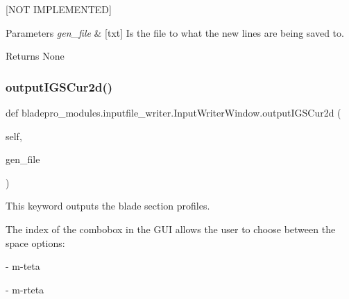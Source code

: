 \mbox{[}N\+OT I\+M\+P\+L\+E\+M\+E\+N\+T\+ED\mbox{]} 


\begin{DoxyParams}{Parameters}
{\em gen\+\_\+file} & \mbox{[}txt\mbox{]} Is the file to what the new lines are being saved to. \\
\hline
\end{DoxyParams}
\begin{DoxyReturn}{Returns}
None 
\end{DoxyReturn}
\hypertarget{classbladepro__modules_1_1inputfile__writer_1_1_input_writer_window_ace84b07ce1416a3535068da6baa2e7d3}{}\label{classbladepro__modules_1_1inputfile__writer_1_1_input_writer_window_ace84b07ce1416a3535068da6baa2e7d3} 
\subsubsection{\texorpdfstring{output\+I\+G\+S\+Cur2d()}{outputIGSCur2d()}}
{\footnotesize\ttfamily def bladepro\+\_\+modules.\+inputfile\+\_\+writer.\+Input\+Writer\+Window.\+output\+I\+G\+S\+Cur2d (\begin{DoxyParamCaption}\item[{}]{self,  }\item[{}]{gen\+\_\+file }\end{DoxyParamCaption})}



This keyword outputs the blade section profiles. 

The index of the combobox in the G\+UI allows the user to choose between the space options\+:

\begin{DoxyItemize}
\item {} -\/ m\textquotesingle{}-\/teta \item {} -\/ m-\/rteta\end{DoxyItemize}

